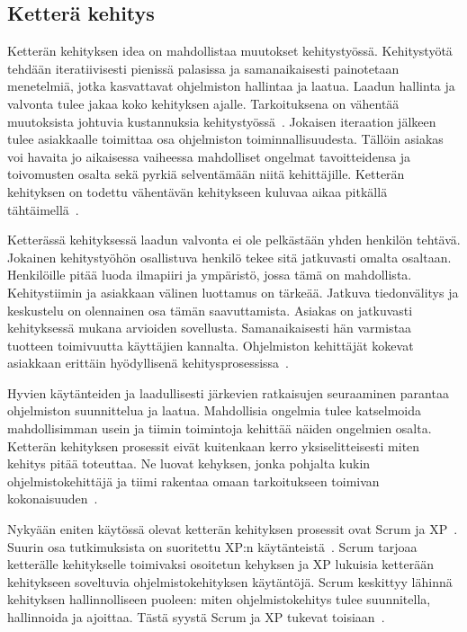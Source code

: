 \documentclass[finnish]{../tktltiki2}
\theoremstyle{definition}
\theoremstyle{remark}
\begin{document}
\subsection{Ketterä kehitys}

Ketterän kehityksen idea on mahdollistaa muutokset kehitystyössä. Kehitystyötä tehdään iteratiivisesti pienissä 
palasissa ja samanaikaisesti painotetaan menetelmiä, jotka kasvattavat ohjelmiston hallintaa ja laatua. Laadun hallinta 
ja valvonta tulee jakaa koko kehityksen ajalle. Tarkoituksena on vähentää muutoksista johtuvia kustannuksia 
kehitystyössä~\cite{HC01}. Jokaisen iteraation jälkeen tulee asiakkaalle toimittaa osa ohjelmiston 
toiminnallisuudesta. Tällöin asiakas voi havaita jo aikaisessa vaiheessa mahdolliset ongelmat tavoitteidensa ja 
toivomusten osalta sekä pyrkiä selventämään niitä kehittäjille. Ketterän kehityksen on todettu vähentävän kehitykseen 
kuluvaa aikaa pitkällä tähtäimellä~\cite{HC01}.

    Ketterässä kehityksessä laadun valvonta ei ole pelkästään yhden henkilön tehtävä. Jokainen kehitystyöhön osallistuva 
henkilö tekee sitä jatkuvasti omalta osaltaan. Henkilöille pitää luoda ilmapiiri ja ympäristö, jossa tämä on 
mahdollista. Kehitystiimin ja asiakkaan välinen luottamus on tärkeää. Jatkuva tiedonvälitys ja keskustelu on olennainen 
osa tämän saavuttamista. Asiakas on jatkuvasti kehityksessä mukana arvioiden sovellusta. Samanaikaisesti hän varmistaa 
tuotteen toimivuutta käyttäjien kannalta. Ohjelmiston kehittäjät kokevat asiakkaan erittäin hyödyllisenä 
kehitysprosessissa~\cite{DD08}.

    Hyvien käytänteiden ja laadullisesti järkevien ratkaisujen seuraaminen parantaa ohjelmiston suunnittelua ja laatua. 
Mahdollisia ongelmia tulee katselmoida mahdollisimman usein ja tiimin toimintoja kehittää näiden ongelmien osalta. 
Ketterän kehityksen prosessit eivät kuitenkaan kerro yksiselitteisesti miten kehitys pitää toteuttaa. Ne luovat 
kehyksen, jonka pohjalta kukin ohjelmistokehittäjä ja tiimi rakentaa omaan tarkoitukseen toimivan 
kokonaisuuden~\cite{Kn07}.

    Nykyään eniten käytössä olevat ketterän kehityksen prosessit ovat Scrum ja XP~\cite{SS10}. Suurin osa tutkimuksista on 
suoritettu XP:n käytänteistä~\cite{DD08}. Scrum tarjoaa ketterälle kehitykselle toimivaksi osoitetun kehyksen ja XP 
lukuisia ketterään kehitykseen soveltuvia ohjelmistokehityksen käytäntöjä. Scrum keskittyy lähinnä kehityksen 
hallinnolliseen puoleen: miten ohjelmistokehitys tulee suunnitella, hallinnoida ja ajoittaa. Tästä syystä Scrum ja XP 
tukevat toisiaan~\cite{Kn07}.
\end{document}
